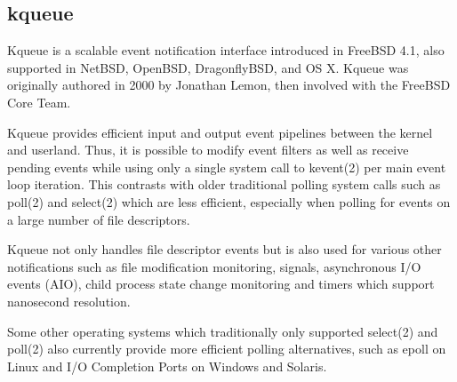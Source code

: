 \begin{lstlisting}[language=PHP]

\end{lstlisting}




\begin{lstlisting}[language=PHP]

\end{lstlisting}






\begin{lstlisting}[language=PHP]

\end{lstlisting}




\begin{lstlisting}[language=PHP]

\end{lstlisting}



\subsection{kqueue}



Kqueue is a scalable event notification interface introduced in FreeBSD 4.1, also supported in NetBSD, OpenBSD, DragonflyBSD, and OS X. Kqueue was originally authored in 2000 by Jonathan Lemon, then involved with the FreeBSD Core Team.

Kqueue provides efficient input and output event pipelines between the kernel and userland. Thus, it is possible to modify event filters as well as receive pending events while using only a single system call to kevent(2) per main event loop iteration. This contrasts with older traditional polling system calls such as poll(2) and select(2) which are less efficient, especially when polling for events on a large number of file descriptors.

Kqueue not only handles file descriptor events but is also used for various other notifications such as file modification monitoring, signals, asynchronous I/O events (AIO), child process state change monitoring and timers which support nanosecond resolution.

Some other operating systems which traditionally only supported select(2) and poll(2) also currently provide more efficient polling alternatives, such as epoll on Linux and I/O Completion Ports on Windows and Solaris.

